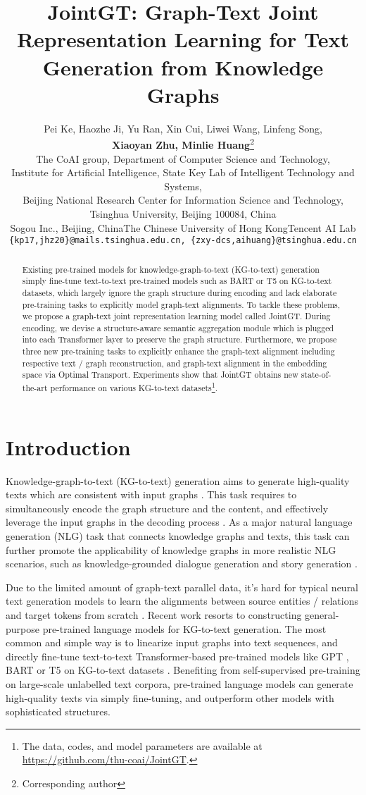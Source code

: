 \documentclass[11pt,a4paper]{article}
\title{JointGT: Graph-Text Joint Representation Learning for Text Generation from Knowledge Graphs}
\author{Pei Ke, Haozhe Ji, Yu Ran, Xin Cui, Liwei Wang, Linfeng Song, \\ \textbf{Xiaoyan Zhu}\textbf{, Minlie Huang}\thanks{\quad Corresponding author}  \\
The CoAI group, Department of Computer Science and Technology, \\
Institute for Artificial Intelligence, State Key Lab of Intelligent Technology and Systems, \\
Beijing National Research Center for Information Science and Technology, \\
Tsinghua University, Beijing 100084, China \\
Sogou Inc., Beijing, China\quad The Chinese University of Hong Kong\quad Tencent AI Lab \\
  {\tt\small \{kp17,jhz20\}@mails.tsinghua.edu.cn, \{zxy-dcs,aihuang\}@tsinghua.edu.cn} \\}
\date{}
\begin{document}
\maketitle
\begin{abstract}

Existing pre-trained models for knowledge-graph-to-text (KG-to-text) generation simply fine-tune text-to-text pre-trained models such as BART or T5 on KG-to-text datasets, which largely ignore the graph structure during encoding and lack elaborate pre-training tasks to explicitly model graph-text alignments. To tackle these problems, we propose a graph-text joint representation learning model called JointGT. During encoding, we devise a structure-aware semantic aggregation module which is plugged into each Transformer layer to preserve the graph structure. Furthermore, we propose three new pre-training tasks to explicitly enhance the graph-text alignment including respective text / graph reconstruction, and graph-text alignment in the embedding space via Optimal Transport. Experiments show that JointGT obtains new state-of-the-art performance on various KG-to-text datasets\footnote{The data, codes, and model parameters are available at \url{https://github.com/thu-coai/JointGT}.}.

\end{abstract}

\section{Introduction}

Knowledge-graph-to-text (KG-to-text) generation aims to generate high-quality texts which are consistent with input graphs \cite{gradent2017webnlg}. This task requires to simultaneously encode the graph structure and the content, and effectively leverage the input graphs in the decoding process \cite{zhao2020bridge}. As a major natural language generation (NLG) task that connects knowledge graphs and texts, this task can further promote the applicability of knowledge graphs in more realistic NLG scenarios, such as knowledge-grounded dialogue generation \cite{zhou2018ccm} and story generation \cite{guan2019seg,ji2020multihop}.

Due to the limited amount of graph-text parallel data, it's hard for typical neural text generation models to learn the alignments between source entities / relations and target tokens from scratch \cite{guo2020cyclegt,fu2020partial}. Recent work resorts to constructing general-purpose pre-trained language models for KG-to-text generation. The most common and simple way is to linearize input graphs into text sequences, and directly fine-tune text-to-text Transformer-based pre-trained models like GPT \cite{radford2018gpt,radford2019gpt2}, BART \cite{lewis2020bart} or T5 \cite{raffel2020t5} on KG-to-text datasets \cite{ribeiro2020investigate,kale2020text}. Benefiting from self-supervised pre-training on large-scale unlabelled text corpora, pre-trained language models can generate high-quality texts via simply fine-tuning, and outperform other models with sophisticated structures. 
\end{document}
